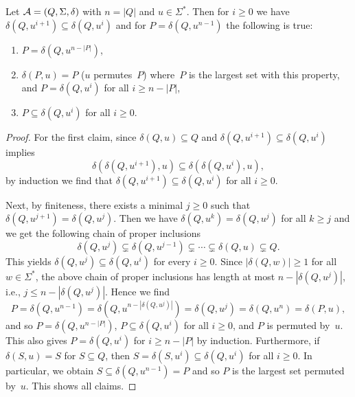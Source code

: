 \begin{proposition} \label{prelim:fact:cycle_states} \label{prelim:automata:power:P}
	Let $\mathcal A = (Q, \Sigma, \delta)$ with $n = |Q|$ and $u \in \Sigma^*$. 
	Then for $i \ge 0$ we have
	$\delta(Q, u^{i+1}) \subseteq \delta(Q, u^i)$
	and for $P = \delta(Q, u^{n-1})$
	the following is true:
	\begin{enumerate}
	\item $P = \delta(Q, u^{n - |P|})$,
		
	\item $\delta(P, u) = P$ ($u$ permutes~$P$) where~$P$
	is the largest set with this property, and $P = \delta(Q, u^i)$ for all $i \ge n - |P|$,
		
	\item $P \subseteq \delta(Q, u^i)$ for all $i \ge 0$.
	\end{enumerate}
\end{proposition}
\begin{proof}
	For the first claim, since $\delta(Q, u) \subseteq Q$
	and $\delta(Q, u^{i+1}) \subseteq \delta(Q, u^i)$
	implies 
	\[ \delta(\delta(Q, u^{i+1}), u) \subseteq \delta(\delta(Q, u^i), u),
	\]
	by induction we find that $\delta(Q, u^{i+1}) \subseteq \delta(Q, u^i)$
	for all $i \ge 0$.
	
	Next, by finiteness, there exists a minimal $j \ge 0$
	such that $\delta(Q, u^{j+1}) = \delta(Q, u^j)$.
	Then we have $\delta(Q, u^k) = \delta(Q, u^j)$ for all $k \ge j$
	and we get the following chain of proper inclusions
	\begin{equation}\label{prelim:automata:power:eqn:seq}
		\delta(Q, u^j) \subsetneq \delta(Q, u^{j-1}) \subsetneq\cdots \subsetneq \delta(Q, u) \subsetneq Q.
	\end{equation}
	This yields $\delta(Q, u^j) \subseteq \delta(Q, u^i)$ for every $i \ge 0$.
	Since $|\delta(Q, w)| \ge 1$ for all $w \in \Sigma^*$,
	the above chain of proper inclusions has length at most $n - |\delta(Q, u^j)|$, i.e., $j  \le n - |\delta(Q, u^j)|$.
	Hence we find
	\[
	P = \delta(Q, u^{n-1}) = \delta(Q, u^{n - |\delta(Q, u^j)|}) = \delta(Q, u^j)
	= \delta(Q, u^{n}) = \delta(P, u),
	\]
	and so $P = \delta(Q, u^{n - |P|})$,
	$P \subseteq \delta(Q, u^i)$ for all $i \ge 0$,
	and $P$ is permuted by~$u$. This also gives
	$P = \delta(Q, u^i)$ for $i \ge n - |P|$
	by induction.	
	Furthermore, if $\delta(S, u) = S$ for $S \subseteq Q$,
	then $S = \delta(S, u^i) \subseteq \delta(Q, u^{i})$ for all $i \ge 0$.
	In particular, we obtain $S \subseteq \delta(Q, u^{n-1}) = P$
	and so $P$ is the largest set permuted by~$u$. This shows all claims.
\end{proof}

